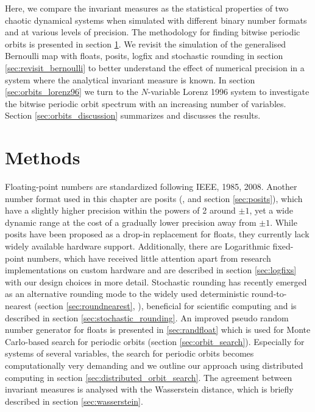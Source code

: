 Here, we compare the invariant measures as the statistical properties of two chaotic dynamical systems when simulated with
different binary number formats and at various levels of precision. The methodology for finding bitwise periodic orbits is presented
in section \ref{sec:orbits_methods}. We revisit the simulation of the generalised Bernoulli map with floats,
posits, logfix and stochastic rounding in section \ref{sec:revisit_bernoulli} to better understand the effect of numerical precision
in a system where the analytical invariant measure is known. In section \ref{sec:orbits_lorenz96} we turn to the $N$-variable Lorenz
1996 system to investigate the bitwise periodic orbit spectrum with an increasing number of variables. Section \ref{sec:orbits_discussion}
summarizes and discusses the results. 

\section{Methods}
\label{sec:orbits_methods}

Floating-point numbers are standardized following IEEE, 1985, 2008. Another number format used in this chapter are posits
(\cite{Gustafson2017a}, and section \ref{sec:posits}), which have a slightly higher precision within the powers of 2
around $\pm1$, yet a wide dynamic range at the cost of a gradually lower precision away from $\pm1$. While posits
have been proposed as a drop-in replacement for floats, they currently lack widely available hardware support.
Additionally, there are Logarithmic fixed-point numbers, which have received little attention apart from research
implementations on custom hardware \citep{Johnson2020} and are described in section \ref{sec:logfixs} with our
design choices in more detail. Stochastic rounding has recently emerged as an alternative rounding mode to the
widely used deterministic round-to-nearest (section \ref{sec:roundnearest}, \cite{IEEE1985}), beneficial for scientific computing
\citep{Croci2020,Fasi2021,Hopkins2020,Paxton2021} and is described in section \ref{sec:stochastic_rounding}.
An improved pseudo random number generator for floats is presented in \ref{sec:randfloat} which is used for Monte
Carlo-based search for periodic orbits (section \ref{sec:orbit_search}). Especially for systems of several variables,
the search for periodic orbits becomes computationally very demanding and we outline our approach using
distributed computing in section \ref{sec:distributed_orbit_search}. The agreement between invariant measures
is analysed with the Wasserstein distance, which is briefly described in section \ref{sec:wasserstein}.

